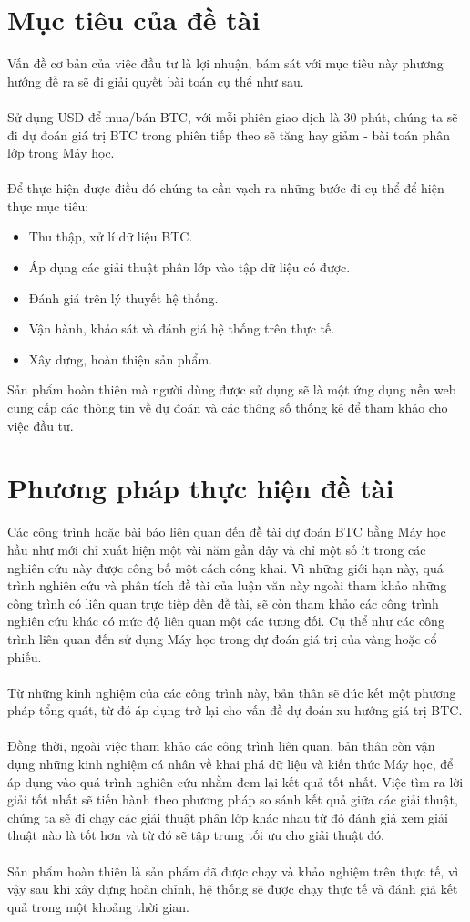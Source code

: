 \section{Mục tiêu của đề tài}
Vấn đề cơ bản của việc đầu tư là lợi nhuận, bám sát với mục tiêu này phương hướng 
đề ra sẽ đi giải quyết bài toán cụ thể như sau.\\\\
Sử dụng USD để mua/bán BTC, với mỗi phiên giao dịch là 30 phút, chúng 
ta sẽ đi dự đoán giá trị BTC trong phiên tiếp theo sẽ tăng hay giảm - bài
toán phân lớp trong Máy học.\\\\
Để thực hiện được điều đó chúng ta cần vạch ra những bước đi cụ
thể để hiện thực mục tiêu:
\begin{itemize}
  \item Thu thập, xử lí dữ liệu BTC.
  \item Áp dụng các giải thuật phân lớp vào tập dữ liệu có được.
  \item Đánh giá trên lý thuyết hệ thống.
  \item Vận hành, khảo sát và đánh giá hệ thống trên thực tế.
  \item Xây dựng, hoàn thiện sản phẩm.
\end{itemize} 
Sản phẩm hoàn thiện mà người dùng được sử dụng sẽ là một ứng dụng nền web cung 
cấp các thông tin về dự đoán và các thông số thống kê để tham khảo cho việc 
đầu tư.
\section{Phương pháp thực hiện đề tài}
Các công trình hoặc bài báo liên quan đến đề tài dự đoán BTC bằng Máy học hầu 
như mới chỉ xuất hiện một vài năm gần đây và chỉ một số ít trong các nghiên cứu 
này được công bố một cách công khai. Vì những giới hạn này, quá trình nghiên 
cứu và phân tích đề tài của luận văn này ngoài tham khảo những công trình có 
liên quan trực tiếp đến đề tài, sẽ còn tham khảo các công trình nghiên cứu khác 
có mức độ liên quan một các tương đối. Cụ thể như các công trình liên 
quan đến sử dụng Máy học trong dự đoán giá trị của vàng hoặc cổ phiếu.\\\\
Từ những kinh nghiệm của các công trình này, bản thân sẽ đúc kết một phương pháp tổng 
quát, từ đó áp dụng trở lại cho vấn đề dự đoán xu hướng giá trị BTC.\\\\
Đồng thời, ngoài việc tham khảo các công trình liên quan, bản thân còn vận dụng 
những kinh nghiệm cá nhân về khai phá dữ liệu và kiến thức Máy học, để áp dụng 
vào quá trình nghiên cứu nhằm đem lại kết quả tốt nhất. Việc tìm ra lời giải 
tốt nhất sẽ tiến hành theo phương pháp so sánh kết quả giữa các giải thuật, 
chúng ta sẽ đi chạy các giải thuật phân lớp khác nhau từ đó đánh giá xem giải 
thuật nào là tốt hơn và từ đó sẽ tập trung tối ưu cho giải thuật đó.\\\\
Sản phẩm hoàn thiện là sản phẩm đã được chạy và khảo nghiệm trên thực tế, vì vậy 
sau khi xây dựng hoàn chỉnh, hệ thống sẽ được chạy thực tế và đánh giá kết quả 
trong một khoảng thời gian.
